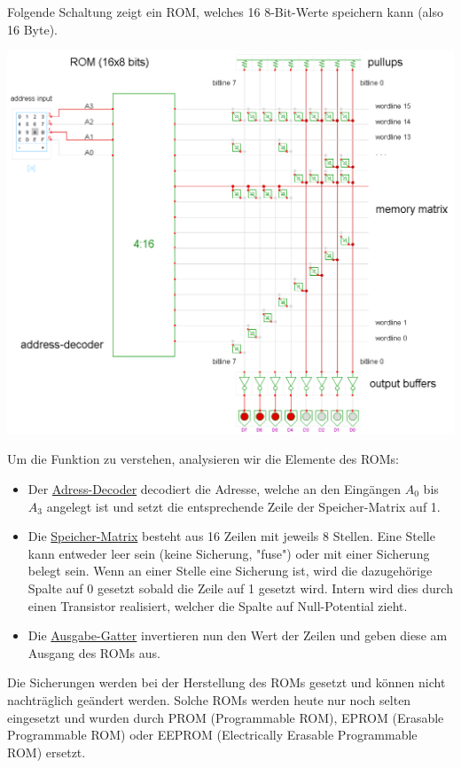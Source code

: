 \documentclass{report}
\begin{document}
Folgende Schaltung zeigt ein ROM, welches 16 8-Bit-Werte speichern kann (also 16 Byte).
\begin{center}\includegraphics[scale=0.25]{img/rom.png}\end{center}
Um die Funktion zu verstehen, analysieren wir die Elemente des ROMs:
\begin{itemize}
\item Der \underline{Adress-Decoder} decodiert die Adresse, welche an den Eingängen $A_0$ bis $A_3$ angelegt ist und setzt die entsprechende Zeile der Speicher-Matrix auf 1.
\item Die \underline{Speicher-Matrix} besteht aus 16 Zeilen mit jeweils 8 Stellen. Eine Stelle kann entweder leer sein (keine Sicherung, "fuse") oder mit einer Sicherung belegt sein. Wenn an einer Stelle eine Sicherung ist, wird die dazugehörige Spalte auf 0 gesetzt sobald die Zeile auf 1 gesetzt wird. Intern wird dies durch einen Transistor realisiert, welcher die Spalte auf Null-Potential zieht.
\item Die \underline{Ausgabe-Gatter} invertieren nun den Wert der Zeilen und geben diese am Ausgang des ROMs aus.
\end{itemize}
Die Sicherungen werden bei der Herstellung des ROMs gesetzt und können nicht nachträglich geändert werden. Solche ROMs werden heute nur noch selten eingesetzt und wurden durch PROM (Programmable ROM), EPROM (Erasable Programmable ROM) oder EEPROM (Electrically Erasable Programmable ROM) ersetzt.
\end{document}
